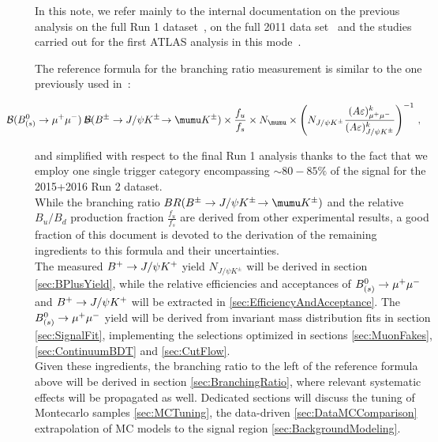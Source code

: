 In this note, we refer mainly to the internal documentation on the previous
analysis on the full Run 1 dataset~\cite{Alpigiani:1756291,Aaboud:2016ire},
on the full 2011 data set~\cite{bsmumuv2} and the studies carried out for the first ATLAS analysis
in this mode~\cite{Aad:2012pn}. %

The reference formula for the branching ratio measurement is similar to the
one previously used in~\cite{Aad:2012pn}:

\begin{eqnarray}
  \hbox{\hspace{-1cm}} \BR (\Bmumu)=&
  \hbox{\hspace{-3mm}}\BR (\BpmKpmJpsi\! \to \mumu K^\pm)\times
  \frac{f_{u}}{f_{s}}\times N_{\mumu}\times \left( N_{J/\psi K^\pm} \theInvRhok \right)^{-1}\, ,\label{eq:BRFormula}
\end{eqnarray}

and simplified with respect to the final Run 1 analysis thanks to the fact that we employ one single
trigger category encompassing $\sim 80-85\%$ of the signal for the 2015+2016 Run 2 dataset.\\
While the branching ratio $BR (\BpmKpmJpsi\! \to \mumu K^\pm)$ and the relative $B_u/B_d$ production
fraction $\frac{f_{u}}{f_{s}}$ are derived from other experimental results, a good fraction of this
document is devoted to the derivation of the remaining ingredients to this formula and their uncertainties.\\
The measured $B^+ \to J/\psi K^+$ yield $N_{J/\psi K^\pm}$ will be derived in section \ref{sec:BPlusYield}, while
the relative efficiencies and acceptances of $B_{(s)}^0 \to \mu^+\mu^-$ and $B^+ \to J/\psi K^+$ will be extracted in \ref{sec:EfficiencyAndAcceptance}.
The $B_{(s)}^0 \to \mu^+\mu^-$ yield will be derived from invariant mass distribution fits in section \ref{sec:SignalFit}, implementing
the selections optimized in sections \ref{sec:MuonFakes}, \ref{sec:ContinuumBDT} and \ref{sec:CutFlow}.\\
Given these ingredients, the branching ratio to the left of the reference formula above will be derived in
section \ref{sec:BranchingRatio}, where relevant systematic effects will be propagated as well.
Dedicated sections will discuss the tuning of Montecarlo samples \ref{sec:MCTuning}, the data-driven \ref{sec:DataMCComparison} extrapolation of
MC models to the signal region \ref{sec:BackgroundModeling}.

\clearpage
